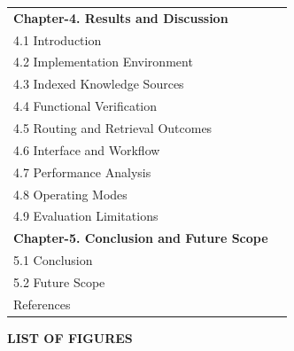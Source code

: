 \begin{tabular*}{\textwidth}{l @{\extracolsep{\fill}} r}
\textbf{Chapter-4. Results and Discussion} & \pageref{chap:results-discussion} \\
\hspace{0.5cm} 4.1 Introduction & \pageref{sec:results-introduction} \\
\hspace{0.5cm} 4.2 Implementation Environment & \pageref{sec:results-environment} \\
\hspace{0.5cm} 4.3 Indexed Knowledge Sources & \pageref{sec:results-indexed-sources} \\
\hspace{0.5cm} 4.4 Functional Verification & \pageref{sec:results-functional-verification} \\
\hspace{0.5cm} 4.5 Routing and Retrieval Outcomes & \pageref{sec:results-routing-retrieval} \\
\hspace{0.5cm} 4.6 Interface and Workflow & \pageref{sec:results-interface-workflow} \\
\hspace{0.5cm} 4.7 Performance Analysis & \pageref{sec:results-performance} \\
\hspace{0.5cm} 4.8 Operating Modes & \pageref{sec:results-operating-modes} \\
\hspace{0.5cm} 4.9 Evaluation Limitations & \pageref{sec:results-limitations} \\
\textbf{Chapter-5. Conclusion and Future Scope} & \pageref{chap:conclusion} \\
\hspace{0.5cm} 5.1 Conclusion & \pageref{sec:conclusion-summary} \\
\hspace{0.5cm} 5.2 Future Scope & \pageref{sec:conclusion-future-scope} \\[0.5cm]

References & \pageref{sec:references} \\

\end{tabular*}

\newpage
\begin{center}
            {\fontsize{14}{16}\selectfont \textbf{LIST OF FIGURES}}
\end{center}
\label{front:list-figures}
\vspace{1cm}
\renewcommand{\arraystretch}{1.5}

